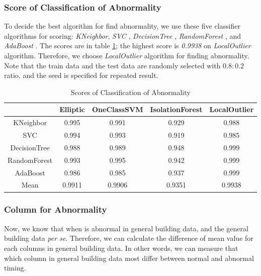 \documentclass[aps, 10pt, a4paper]{article}
\begin{document}
            \subsubsection{Score of Classification of Abnormality}
                To decide the best algorithm for find abnormality, we use these five classifier algorithms for scoring: \textit{KNeighbor}, \textit{SVC} \cite{ref:svc1, ref:svc2}, \textit{DecisionTree} \cite{ref:decisiontree1, ref:decisiontree2, ref:decisiontree3}, \textit{RandomForest} \cite{ref:decisiontree3}, and \textit{AdaBoost} \cite{ref:ada1, ref:ada2}. The scores are in table \ref{tb:abnormal}; the highest score is \textit{0.9938} on \textit{LocalOutlier} algorithm. Therefore, we choose \textit{LocalOutlier} algorithm for finding abnormality. Note that the train data and the test data are randomly selected with \( 0.8 : 0.2\) ratio, and the seed is specified for repeated result. 
                
                \begin{table}[htbp]
                    \centering
                    \caption{Scores of Classification of Abnormality}
                    \label{tb:abnormal}
                    \begin{tabular}{c|cccc}
                        & Elliptic & OneClassSVM & IsolationForest & LocalOutlier \\ \hline
                        KNeighbor & 0.995 & 0.991 & 0.929 & 0.988 \\
                        SVC & 0.994 & 0.993 & 0.919 & 0.985 \\
                        DecisionTree & 0.988 & 0.989 & 0.948 & 0.999 \\
                        RandomForest & 0.993 & 0.995 & 0.942 & 0.999 \\
                        AdaBoost & 0.986 & 0.985 & 0.937 & 0.999 \\ \hline
                        Mean & 0.9911 & 0.9906 & 0.9351 & 0.9938 \\
                    \end{tabular}
                \end{table}
            
            \subsubsection{Column for Abnormality}
                Now, we know that when is abnormal in general building data, and the general building data \textit{per se}. Therefore, we can calculate the difference of mean value for each columns in general building data. In other words, we can measure that which column in general building data most differ between normal and abnormal timing.
                
\end{document}
